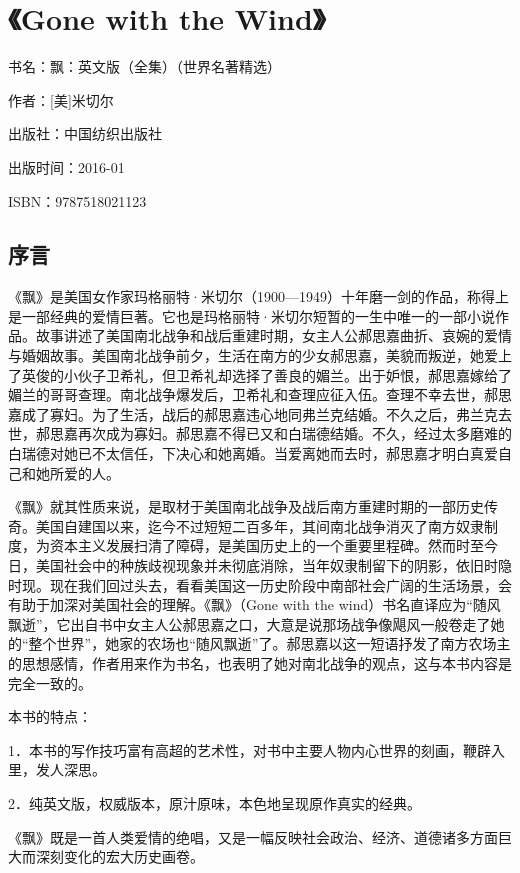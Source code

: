 


\section{《Gone with the Wind》}

\par 书名：飘：英文版（全集）（世界名著精选）
\par 作者：[美]米切尔
\par 出版社：中国纺织出版社
\par 出版时间：2016-01
\par ISBN：9787518021123


\subsection*{序言}
\par 《飘》是美国女作家玛格丽特·米切尔（1900—1949）十年磨一剑的作品，称得上是一部经典的爱情巨著。它也是玛格丽特·米切尔短暂的一生中唯一的一部小说作品。故事讲述了美国南北战争和战后重建时期，女主人公郝思嘉曲折、哀婉的爱情与婚姻故事。美国南北战争前夕，生活在南方的少女郝思嘉，美貌而叛逆，她爱上了英俊的小伙子卫希礼，但卫希礼却选择了善良的媚兰。出于妒恨，郝思嘉嫁给了媚兰的哥哥查理。南北战争爆发后，卫希礼和查理应征入伍。查理不幸去世，郝思嘉成了寡妇。为了生活，战后的郝思嘉违心地同弗兰克结婚。不久之后，弗兰克去世，郝思嘉再次成为寡妇。郝思嘉不得已又和白瑞德结婚。不久，经过太多磨难的白瑞德对她已不太信任，下决心和她离婚。当爱离她而去时，郝思嘉才明白真爱自己和她所爱的人。
\par 《飘》就其性质来说，是取材于美国南北战争及战后南方重建时期的一部历史传奇。美国自建国以来，迄今不过短短二百多年，其间南北战争消灭了南方奴隶制度，为资本主义发展扫清了障碍，是美国历史上的一个重要里程碑。然而时至今日，美国社会中的种族歧视现象并未彻底消除，当年奴隶制留下的阴影，依旧时隐时现。现在我们回过头去，看看美国这一历史阶段中南部社会广阔的生活场景，会有助于加深对美国社会的理解。《飘》（Gone with the wind）书名直译应为“随风飘逝”，它出自书中女主人公郝思嘉之口，大意是说那场战争像飓风一般卷走了她的“整个世界”，她家的农场也“随风飘逝”了。郝思嘉以这一短语抒发了南方农场主的思想感情，作者用来作为书名，也表明了她对南北战争的观点，这与本书内容是完全一致的。
\par 本书的特点：
\par 1．本书的写作技巧富有高超的艺术性，对书中主要人物内心世界的刻画，鞭辟入里，发人深思。
\par 2．纯英文版，权威版本，原汁原味，本色地呈现原作真实的经典。
\par 《飘》既是一首人类爱情的绝唱，又是一幅反映社会政治、经济、道德诸多方面巨大而深刻变化的宏大历史画卷。



